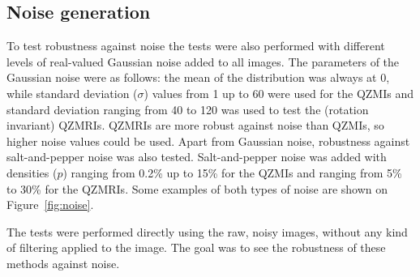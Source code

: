 \subsection{Noise generation}
To test robustness against noise the tests were also performed with different levels of real-valued Gaussian noise added to all images. The parameters of the Gaussian noise were as follows: the mean of the distribution was always at 0, while standard deviation ($\sigma$) values from 1 up to 60 were used for the QZMIs and standard deviation ranging from 40 to 120 was used to test the (rotation invariant) QZMRIs. QZMRIs are more robust against noise than QZMIs, so higher noise values could be used.
Apart from Gaussian noise, robustness against salt-and-pepper noise was also tested. Salt-and-pepper noise was added with densities ($p$) ranging from 0.2\% up to 15\% for the QZMIs and ranging from 5\% to 30\% for the QZMRIs. Some examples of both types of noise are shown on Figure~\ref{fig:noise}.


The tests were performed directly using the raw, noisy images, without any kind of filtering applied to the image. The goal was to see the robustness of these methods against noise. 

